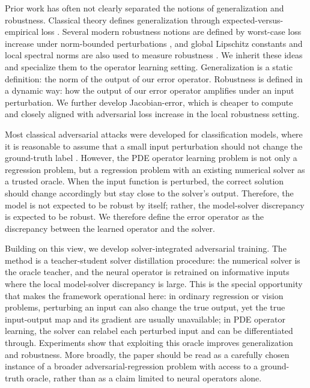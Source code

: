 ﻿\documentclass[letterpaper]{article} %
\begin{document}
Prior work has often not clearly separated the notions of generalization and
robustness.
Classical theory defines generalization through expected-versus-empirical loss
\citep{bousquet2002stability,xu2012robustness}. Several modern robustness
notions are defined by worst-case loss increase under norm-bounded
perturbations \citep{madry2018towards}, and global Lipschitz constants and
local spectral norms are also used to measure robustness
\citep{cisse2017parseval,huang2026stablepdenet}. We inherit these ideas and
specialize them to the operator learning setting. Generalization is a static
definition: the norm of the output of our error operator. Robustness is defined
in a dynamic way: how the output of our error operator amplifies under an input
perturbation. We further develop Jacobian-error, which is cheaper to
compute and closely aligned with adversarial loss increase in the local
robustness setting.

Most classical adversarial attacks were developed for classification models, where it
is reasonable to assume that a small input perturbation should not change the
ground-truth label \citep{goodfellow2015explaining,madry2018towards}. However,
the PDE operator learning problem is not only a regression problem, but a
regression problem with an existing numerical solver as a trusted oracle. When
the input function is perturbed, the correct solution should change accordingly
but stay close to the solver's output. Therefore, the model is not expected to
be robust by itself; rather, the model-solver discrepancy is expected to be
robust. We therefore define the error operator as the discrepancy between the
learned operator and the solver.

Building on this view, we develop solver-integrated adversarial training. The
method is a teacher-student solver distillation procedure: the numerical solver
is the oracle teacher, and the neural operator is retrained on informative
inputs where the local model-solver discrepancy is large. This is the special
opportunity that makes the framework operational here: in ordinary regression or
vision problems, perturbing an input can also change the true output, yet the
true input-output map and its gradient are usually unavailable; in PDE operator
learning, the solver can relabel each perturbed input and can be differentiated
through. Experiments show that exploiting this oracle improves generalization
and robustness. More broadly, the paper should be read as a carefully chosen
instance of a broader adversarial-regression problem with access to a
ground-truth oracle, rather than as a claim limited to neural operators alone.
\end{document}
